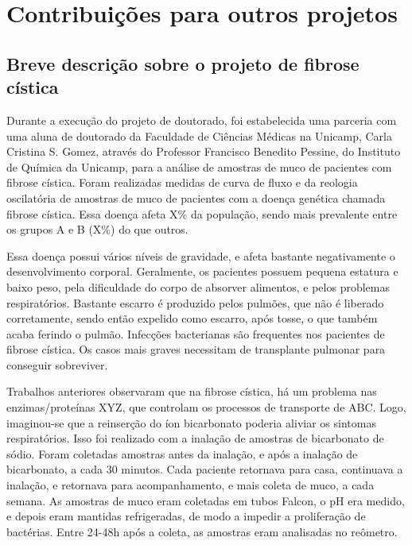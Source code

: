 	
	
\part{Contribuições para outros projetos}

	\chapter{Breve descrição sobre o projeto de fibrose cística}

	Durante a execução do projeto de doutorado, foi estabelecida uma parceria com uma aluna de doutorado da Faculdade de Ciências Médicas na Unicamp, Carla Cristina S. Gomez, através do Professor Francisco Benedito Pessine, do Instituto de Química da Unicamp, para a análise de amostras de muco de pacientes com fibrose cística. Foram realizadas medidas de curva de fluxo e da reologia oscilatória de amostras de muco de pacientes com a doença genética chamada fibrose cística. Essa doença afeta X\% da população, sendo mais prevalente entre os grupos A e B (X\%) do que outros.
	
	Essa doença possui vários níveis de gravidade, e afeta bastante negativamente o desenvolvimento corporal. Geralmente, os pacientes possuem pequena estatura e baixo peso, pela dificuldade do corpo de absorver alimentos, e pelos problemas respiratórios. Bastante escarro é produzido pelos pulmões, que não é liberado corretamente, sendo então expelido como escarro, após tosse, o que também acaba ferindo o pulmão. Infecções bacterianas são frequentes nos pacientes de fibrose cística. Os casos mais graves necessitam de transplante pulmonar para conseguir sobreviver.
	
	Trabalhos anteriores observaram que na fibrose cística, há um problema nas enzimas/proteínas XYZ, que controlam os processos de transporte de ABC. Logo, imaginou-se que a reinserção do íon bicarbonato poderia aliviar os sintomas respiratórios. Isso foi realizado com a inalação de amostras de bicarbonato de sódio. Foram coletadas amostras antes da inalação, e após a inalação de bicarbonato, a cada 30 minutos. Cada paciente retornava para casa, continuava a inalação, e retornava para acompanhamento, e mais coleta de muco, a cada semana. As amostras de muco eram coletadas em tubos Falcon, o pH era medido, e depois eram mantidas refrigeradas, de modo a impedir a proliferação de bactérias. Entre 24-48h após a coleta, as amostras eram analisadas no reômetro.

